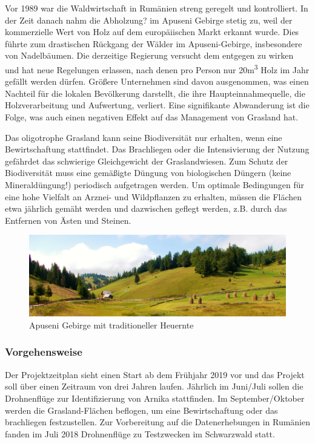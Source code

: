 Vor 1989 war die Waldwirtschaft in Rumänien streng geregelt und kontrolliert. In der Zeit danach nahm die Abholzung? im Apuseni Gebirge stetig zu, weil der kommerzielle Wert von Holz auf dem europäiischen Markt erkannt wurde. Dies führte zum drastischen Rückgang der Wälder im Apuseni-Gebirge, insbesondere von Nadelbäumen. Die derzeitige Regierung versucht dem entgegen zu wirken und hat neue Regelungen erlassen, nach denen pro Person nur 20m\textsuperscript{3} Holz im Jahr gefällt werden dürfen. Größere Unternehmen sind davon ausgenommen, was einen Nachteil für die lokalen Bevölkerung darstellt, die ihre Haupteinnahmequelle, die Holzverarbeitung und Aufwertung, verliert. Eine signifikante Abwanderung ist die Folge, was auch einen negativen Effekt auf das Management von Grasland hat.

Das oligotrophe Grasland kann seine Biodiversität nur erhalten, wenn eine Bewirtschaftung stattfindet. Das Brachliegen oder die Intensivierung der Nutzung gefährdet das schwierige Gleichgewicht der Graslandwiesen. Zum Schutz der Biodiversität muss eine gemäßigte Düngung von biologischen Düngern (keine Mineraldüngung!) periodisch aufgetragen werden. Um optimale Bedingungen für eine hohe Vielfalt an Arznei- und Wildpflanzen zu erhalten, müssen die Flächen etwa jährlich gemäht werden und dazwischen geflegt werden, z.B. durch das Entfernen von Ästen und Steinen.

\begin{figure}[htb]
 \centering
  \includegraphics[width=\textwidth,angle=0]{abb/Arnika/apusenimountain2016}
 \caption{Apuseni Gebirge mit traditioneller Heuernte}
\label{fig:apuseni}
\end{figure}


\subsubsection{Vorgehensweise}

Der Projektzeitplan sieht einen Start ab dem Frühjahr 2019 vor und das Projekt soll über einen Zeitraum von drei Jahren laufen. Jährlich im Juni/Juli sollen die Drohnenflüge zur Identifizierung von Arnika stattfinden. Im September/Oktober werden die Grasland-Flächen beflogen, um eine Bewirtschaftung oder das brachliegen festzustellen. Zur Vorbereitung auf die Datenerhebungen in Rumänien fanden im Juli 2018 Drohnenflüge zu Testzwecken im Schwarzwald statt.

